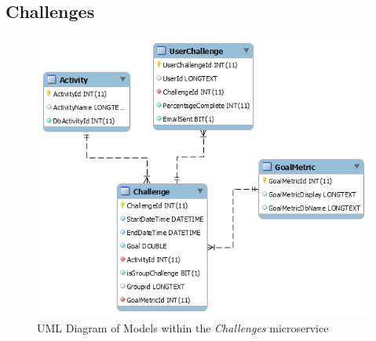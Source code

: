 \subsection{Challenges}
\begin{figure}[H]
    \centering
    \includegraphics[width=\textwidth]{Images/db_uml/challenges.png}
    \caption{UML Diagram of Models within the \textit{Challenges} microservice}
    \label{fig:db_uml:challenges}
\end{figure}

